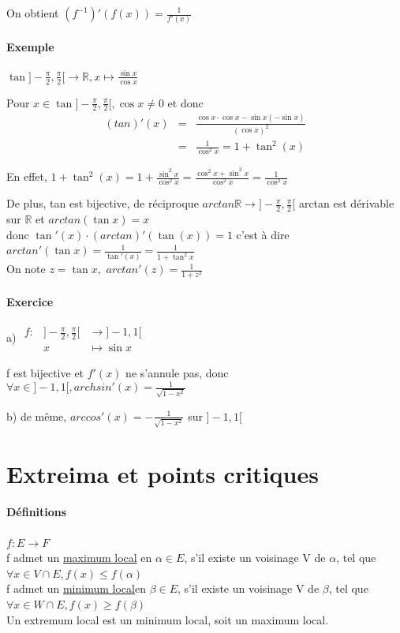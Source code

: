 On obtient $(f^{-1})'(f(x))=\frac{1}{f'(x)}$

\paragraph{Exemple} $\tan]-\frac{\pi}{2}, \frac{\pi}{2}[ \rightarrow \mathbb{R}, x\mapsto \frac{\sin x}{\cos x}$

Pour $x\in \tan]-\frac{\pi}{2},\frac{\pi}{2}[, \cos x \neq 0$ et donc \[
		\begin{array}{rcl}
			(tan)'(x) &=& \frac{\cos x \cdot \cos x - \sin x(-\sin x)}{(\cos x)^2} \\
										   &=& \frac{1}{\cos^2 x} = 1+\tan^2(x)
	\end{array}\]

	En effet, $1+\tan^2(x) = 1+\frac{\sin^2x}{\cos^2x} = \frac{\cos^2x+\sin^2x}{\cos^2x} = \frac{1}{\cos^2x}$

De plus, tan est bijective, de réciproque $arctan \mathbb{R} \rightarrow ]-\frac{\pi}{2}, \frac{\pi}{2}[$ arctan est dérivable sur $\mathbb{R}$ et $arctan(\tan x)=x$ ~\\
	donc $\tan'(x) \cdot (arctan)'(\tan(x)) = 1$ c'est à dire ~\\
	$arctan'(\tan x) = \frac{1}{\tan'(x)} = \frac{1}{1+\tan^2x}$ ~\\
	On note $z=\tan x, $ $arctan'(z) = \frac{1}{1+z^2}$

	\paragraph{Exercice} a)
$\begin{array}{rcl}
f:&]-\frac{\pi}{2}, \frac{\pi}{2}[&\rightarrow ]-1, 1[ \\
							 &x&\mapsto \sin x
\end{array}$

f est bijective et $f'(x)$ ne s'annule pas, donc $\forall x \in ]-1, 1[, archsin'(x) = \frac{1}{\sqrt{1-x^2}}$

b) de même, $arccos'(x) = -\frac{1}{\sqrt{1-x^2}}$ sur $]-1, 1[$

	\section{Extreima et points critiques}

	\paragraph{Définitions} $f:E \rightarrow F$ ~\\
	f admet un \ul{maximum local} en $\alpha \in E$, s'il existe un voisinage V de $\alpha$, tel que $\forall x \in V\cap E,f(x) \leq f(\alpha)$ ~\\
	f admet un \ul{minimum local}en $\beta \in E$, s'il existe un voisinage V de $\beta$, tel que $\forall x \in W\cap E,f(x) \geq f(\beta)$ ~\\
	Un extremum local est un minimum local, soit un maximum local.

